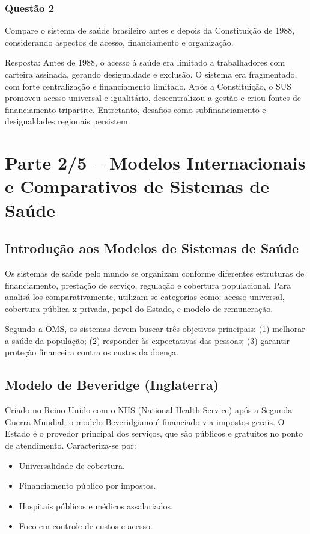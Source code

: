 \documentclass[a4paper,12pt]{article}
\begin{document}
\subsubsection{Questão 2}
\label{sec:org99d5aef}
Compare o sistema de saúde brasileiro antes e depois da Constituição de 1988, considerando aspectos de acesso, financiamento e organização.

Resposta:
Antes de 1988, o acesso à saúde era limitado a trabalhadores com carteira assinada, gerando desigualdade e exclusão. O sistema era fragmentado, com forte centralização e financiamento limitado. Após a Constituição, o SUS promoveu acesso universal e igualitário, descentralizou a gestão e criou fontes de financiamento tripartite. Entretanto, desafios como subfinanciamento e desigualdades regionais persistem.
\section{Parte 2/5 – Modelos Internacionais e Comparativos de Sistemas de Saúde}
\label{sec:org9662140}

\subsection{Introdução aos Modelos de Sistemas de Saúde}
\label{sec:org78288c1}
Os sistemas de saúde pelo mundo se organizam conforme diferentes estruturas de financiamento, prestação de serviço, regulação e cobertura populacional. Para analisá-los comparativamente, utilizam-se categorias como: acesso universal, cobertura pública x privada, papel do Estado, e modelo de remuneração.

Segundo a OMS, os sistemas devem buscar três objetivos principais: (1) melhorar a saúde da população; (2) responder às expectativas das pessoas; (3) garantir proteção financeira contra os custos da doença.
\subsection{Modelo de Beveridge (Inglaterra)}
\label{sec:orgdfeffeb}
Criado no Reino Unido com o NHS (National Health Service) após a Segunda Guerra Mundial, o modelo Beveridgiano é financiado via impostos gerais. O Estado é o provedor principal dos serviços, que são públicos e gratuitos no ponto de atendimento. Caracteriza-se por:

\begin{itemize}
\item Universalidade de cobertura.
\item Financiamento público por impostos.
\item Hospitais públicos e médicos assalariados.
\item Foco em controle de custos e acesso.
\end{itemize}
\end{document}
